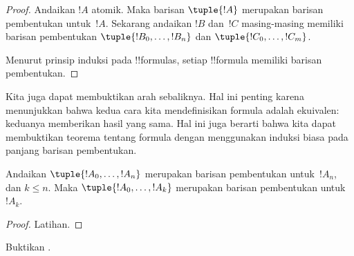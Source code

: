 \documentclass[../../../include/open-logic-section]{subfiles}
\begin{document}
\begin{proof}
Andaikan $!A$ atomik. Maka barisan $\tuple{!A}$ merupakan barisan
pembentukan untuk~$!A$.
%
Sekarang andaikan $!B$ dan~$!C$ masing-masing memiliki barisan pembentukan
$\tuple{!B_0,\dotsc,!B_n}$ dan $\tuple{!C_0,\dotsc,!C_m}$.
%
\begin{enumerate}
\end{enumerate}
Menurut prinsip induksi pada !!{formula}s, setiap !!{formula} memiliki
barisan pembentukan.
\end{proof}

Kita juga dapat membuktikan arah sebaliknya. Hal ini penting karena
menunjukkan bahwa kedua cara kita mendefinisikan formula adalah ekuivalen:
keduanya memberikan hasil yang sama. Hal ini juga berarti bahwa kita dapat
membuktikan teorema tentang formula dengan menggunakan induksi biasa pada
panjang barisan pembentukan.

\begin{lem}
Andaikan $\tuple{!A_0,\dotsc,!A_n}$ merupakan barisan pembentukan
untuk~$!A_n$, dan $k \leq n$. Maka $\tuple{!A_0,\dotsc,!A_k}$ merupakan
barisan pembentukan untuk~$!A_k$.
\end{lem}

\begin{proof}
Latihan.
\end{proof}

\begin{prob}
Buktikan .
\end{prob}
\end{document}

